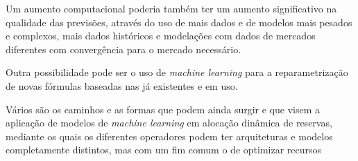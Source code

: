 Um aumento computacional poderia também ter um aumento significativo na qualidade das previsões, através do uso de mais dados e de  modelos mais pesados e complexos, mais dados históricos e modelações com dados de mercados diferentes com convergência para o mercado necessário.\par
Outra possibilidade pode ser o uso de \textit{machine learning} para a reparametrização de novas fórmulas baseadas nas já existentes e em uso.\par
Vários são os caminhos e as formas que podem ainda surgir e que visem a aplicação de modelos de \textit{machine learning} em alocação dinâmica de reservas, mediante os quais os diferentes operadores podem ter arquiteturas e modelos completamente distintos, mas com um fim comum \– o de optimizar recursos
